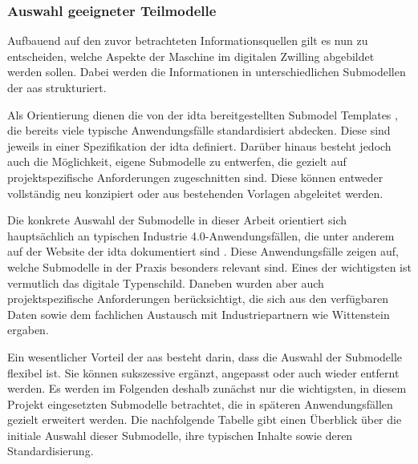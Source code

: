 \subsubsection{Auswahl geeigneter Teilmodelle}
Aufbauend auf den zuvor betrachteten Informationsquellen gilt es nun zu entscheiden, welche Aspekte der Maschine im digitalen Zwilling abgebildet werden sollen.
Dabei werden die Informationen in unterschiedlichen Submodellen der \acs{aas} strukturiert.

Als Orientierung dienen die von der \acs{idta} bereitgestellten Submodel Templates \cite{idtaTemplates}, die bereits viele typische Anwendungsfälle standardisiert abdecken.
Diese sind jeweils in einer Spezifikation der \acs{idta} definiert.
Darüber hinaus besteht jedoch auch die Möglichkeit, eigene Submodelle zu entwerfen, die gezielt auf projektspezifische Anforderungen zugeschnitten sind.
Diese können entweder vollständig neu konzipiert oder aus bestehenden Vorlagen abgeleitet werden.

Die konkrete Auswahl der Submodelle in dieser Arbeit orientiert sich hauptsächlich an typischen Industrie 4.0-Anwendungsfällen, die unter anderem auf der Website der \acs{idta} dokumentiert sind \cite{idtaUseCases}.
Diese Anwendungsfälle zeigen auf, welche Submodelle in der Praxis besonders relevant sind.
Eines der wichtigsten ist vermutlich das digitale Typenschild.
Daneben wurden aber auch projektspezifische Anforderungen berücksichtigt, die sich aus den verfügbaren Daten sowie dem fachlichen Austausch mit Industriepartnern wie Wittenstein ergaben.


Ein wesentlicher Vorteil der \acs{aas} besteht darin, dass die Auswahl der Submodelle flexibel ist.
Sie können sukszessive ergänzt, angepasst oder auch wieder entfernt werden.
Es werden im Folgenden deshalb zunächst nur die wichtigsten, in diesem Projekt eingesetzten Submodelle betrachtet, die in späteren Anwendungsfällen gezielt erweitert werden.
Die nachfolgende Tabelle gibt einen Überblick über die initiale Auswahl dieser Submodelle, ihre typischen Inhalte sowie deren Standardisierung.









